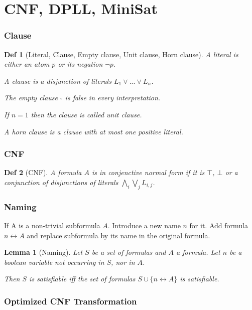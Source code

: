 \documentclass[]{article}
\newtheorem{lemma}{Lemma}
\newtheorem*{definition*}{Def}
\begin{document}
\section{CNF, DPLL, MiniSat}

\subsubsection{Clause}

\begin{definition*}[Literal, Clause, Empty clause, Unit clause, Horn clause]
	A literal is either an atom $p$ or its negation $\lnot p$.
	
	A clause is a disjunction of literals $L_1 \lor ... \lor L_n$.
	
	The empty clause $\square$ is false in every interpretation.
	
	If $n=1$ then the clause is called unit clause.
	
	A horn clause is a clause with at most one positive literal.
\end{definition*}

\subsubsection{CNF}

\begin{definition*}[CNF]
	A formula $A$ is in conjenctive normal form if it is $\top$, $\bot$ or a conjunction of disjunctions of literals $\bigwedge_i \bigvee_j L_{i,j}$.
\end{definition*}

\subsubsection{Naming}

If A is a non-trivial subformula $A$. Introduce a new name $n$ for it. Add formula $n \leftrightarrow A$ and replace subformula by its name in the original formula.

\begin{lemma}[Naming]
	Let $S$ be a set of formulas and $A$ a formula. Let $n$ be a boolean variable not occurring in $S$, nor in $A$.
	
	Then $S$ is satisfiable iff the set of formulas $S \cup \{n \leftrightarrow A\}$ is satisfiable.
\end{lemma}

\subsubsection{Optimized CNF Transformation}
\end{document}
